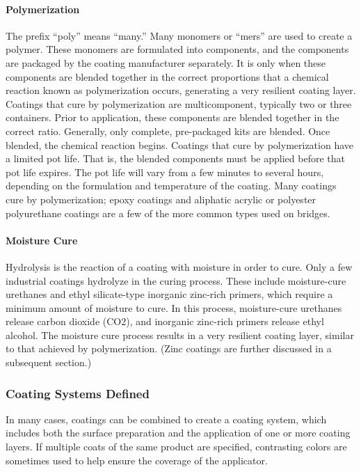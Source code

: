 \paragraph{Polymerization}
The prefix “poly” means “many.” Many monomers or “mers” are used to create a polymer. These monomers are
formulated into components, and the components are packaged by the coating manufacturer separately. It is only
when these components are blended together in the correct proportions that a chemical reaction known as
polymerization occurs, generating a very resilient coating layer. Coatings that cure by polymerization are multicomponent,
typically two or three containers. Prior to application, these components are blended together in the
correct ratio. Generally, only complete, pre-packaged kits are blended. Once blended, the chemical reaction begins.
Coatings that cure by polymerization have a limited pot life. That is, the blended components must be applied before
that pot life expires. The pot life will vary from a few minutes to several hours, depending on the formulation and
temperature of the coating. Many coatings cure by polymerization; epoxy coatings and aliphatic acrylic or polyester
polyurethane coatings are a few of the more common types used on bridges.

\paragraph{Moisture Cure}
Hydrolysis is the reaction of a coating with moisture in order to cure. Only a few industrial coatings hydrolyze in
the curing process. These include moisture-cure urethanes and ethyl silicate-type inorganic zinc-rich primers, which
require a minimum amount of moisture to cure. In this process, moisture-cure urethanes release carbon dioxide
(CO2), and inorganic zinc-rich primers release ethyl alcohol. The moisture cure process results in a very resilient
coating layer, similar to that achieved by polymerization. (Zinc coatings are further discussed in a subsequent
section.)

\subsubsection{Coating Systems Defined}
In many cases, coatings can be combined to create a coating system, which includes both the surface preparation
and the application of one or more coating layers. If multiple coats of the same product are specified, contrasting
colors are sometimes used to help ensure the coverage of the applicator.

